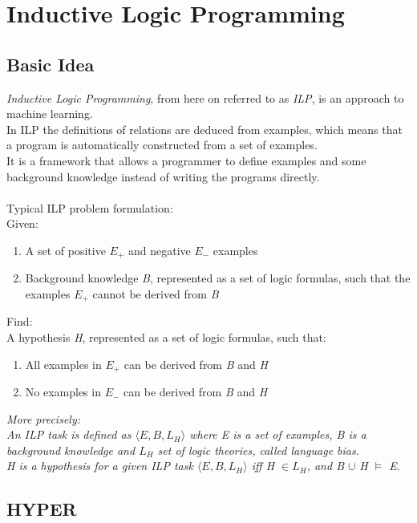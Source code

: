 \documentclass[11pt]{article}
\begin{document}
\section{Inductive Logic Programming}

\subsection{Basic Idea}

\emph{Inductive Logic Programming}, from here on referred to as \emph{ILP}, is an approach to machine learning.\\
In ILP the definitions of relations are deduced from examples, which means that a program is automatically constructed from a set of examples.\\
It is a framework that allows a programmer to define examples and some background knowledge instead of writing the programs directly.\\\\
Typical ILP problem formulation:\\Given:
\begin{enumerate}
\item A set of positive \emph{$E_+$} and negative \emph{$E_-$} examples
\item Background knowledge \emph{B}, represented as a set of logic formulas, such that the examples \emph{$E_+$} cannot be derived from \emph{B}
\end{enumerate}
Find:\\
A hypothesis \emph{H}, represented as a set of logic formulas, such that:
\begin{enumerate}
\item All examples in \emph{$E_+$} can be derived from \emph{B} and \emph{H}
\item No examples in \emph{$E_-$} can be derived from \emph{B} and \emph{H}
\end{enumerate}
\emph{More precisely:
\\
An ILP task is defined as \emph{$\langle E, B, L_H\rangle$} where \emph{E} is a set of examples, \emph{B} is a background knowledge and \emph{$L_H$} set of logic theories, called language bias.\\
\emph{H} is a hypothesis for a given ILP task \emph{$\langle E, B, L_H\rangle$ iff H $\in L_H$, and B $\cup$ H $\models$ E}.} 

\subsection{HYPER}
\end{document}
